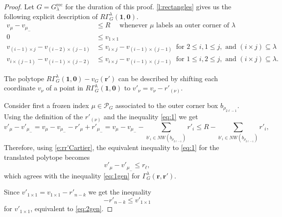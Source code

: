 \documentclass[10pt,a4paper]{amsart}
\newcommand{\muminus}{\mu_{-}}
\newcommand{\rect}{\mathrm{rec}}
\begin{document}
\begin{proof} 
Let $G=G_{\lambda}^{\rect}$ for the duration of this proof. 
 \cref{l:rectangles} gives us the following explicit description of $R\Gamma^\lambda_G(\mathbf 1,\mathbf 0)$.
\begin{align}
		v_{\mu} - v_{\muminus} & \le R\quad \text{ whenever }\mu 
		\text{ labels an outer corner of }\lambda  \label{eq:1}\\
		0 & \leq v_{1 \times 1} \label{eq:2} \\
		v_{(i-1)\times j} - v_{(i-2)\times (j-1)} &\leq
v_{i \times j}  - v_{(i-1)\times (j-1)}
\ \text{ for }2 \leq i, 
		1\leq j, \text{ and } (i \times j) \subseteq \lambda \label{eq:3}\\	
v_{i\times (j-1)}-v_{(i-1)\times (j-2)} &\leq
v_{i\times j}  - v_{(i-1)\times (j-1)}
\ \text{ for } 1\leq i,
		2 \leq j, \text{ and } (i \times j) \subseteq \lambda. \label{eq:4}
	\end{align}
	
	The polytope $R\Gamma^\lambda_G(\mathbf 1,\mathbf 0)-v_G(\mathbf r')$ can be described by shifting each coordinate $v_\nu$ of a point in $R\Gamma^\lambda_G(\mathbf 1,\mathbf 0)$ to $v'_\nu=v_\nu- r'_{(\nu)}$. 

	Consider first a frozen index $\mu\in\mathcal P_G$ associated to the outer corner box $b_{\rho_{2\ell-1}}$. Using the definition of the $r'_{(\nu)}$ and the inequality \eqref{eq:1} we get 
\[
v'_\mu-v'_{\muminus}=v_\mu-v_{\muminus}-r'_\mu+r'_{\muminus}=v_\mu-v_{\muminus}-\sum_{b'_{i}\in NW(b_{\rho_{2\ell-1}})}r'_i\le R -\sum_{b'_{i}\in NW(b_{\rho_{2\ell-1}})}r'_i,
\]
Therefore, 
 using \eqref{e:rr'Cartier}, the equivalent inequality to \eqref{eq:1} for the translated polytope becomes
\begin{equation} v'_{\mu} - v'_{\muminus} \le r_\ell, \label{eq:1'}
 \end{equation}
 which agrees with the inequality \eqref{eq:1gen} for $\Gamma^\lambda_G(\mathbf r,\mathbf{r'})$.
  
Since $v'_{1\times 1}=v_{1\times 1}-r'_{n-k}$ we get the inequality
\begin{equation}-r'_{n-k}\le  v'_{1\times 1}  \label{eq:2'}
 \end{equation}
 for $v'_{1\times 1}$, equivalent to \eqref{eq:2gen}.
 

\end{proof}
\end{document}

